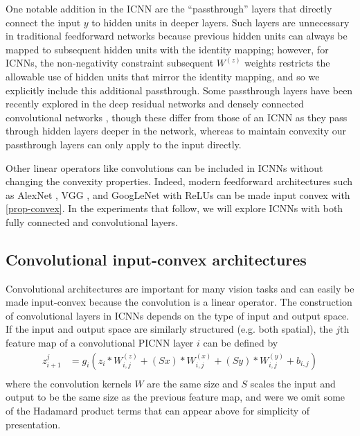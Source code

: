 One notable addition in the ICNN are the ``passthrough'' layers that directly
connect the input $y$ to hidden units in deeper layers.  Such layers are
unnecessary in traditional feedforward networks because previous hidden units
can always be mapped to subsequent hidden units with the identity mapping;
however, for ICNNs, the non-negativity constraint subsequent $W^{(z)}$ weights
restricts the allowable use of hidden units that mirror the identity mapping,
and so we explicitly include this additional passthrough.  Some
passthrough layers have been recently explored in the deep residual networks
\citep{he2015deep} and densely connected convolutional
networks \citep{huang2016densely},
though these differ from those of an ICNN as they pass through
hidden layers deeper in the network, whereas to maintain convexity our
passthrough layers can only apply to the input directly.

Other linear operators like convolutions can
be included in ICNNs without changing the convexity properties.
Indeed, modern feedforward architectures such as AlexNet
\citep{krizhevsky2012imagenet}, VGG \citep{simonyan2014very}, and GoogLeNet
\citep{szegedy2015going} with ReLUs \citep{nair2010rectified} can be made
input convex with \cref{prop-convex}.
In the experiments that follow, we will explore ICNNs with both
fully connected and convolutional layers.

\subsection{Convolutional input-convex architectures}
Convolutional architectures are important for many vision
tasks and can easily be made input-convex because
the convolution is a linear operator.
The construction of convolutional layers in ICNNs depends
on the type of input and output space.
If the input and output space are similarly
structured (e.g. both spatial), the $j$th feature map
of a convolutional PICNN layer $i$ can be defined by
\begin{equation}
\begin{split}
z_{i+1}^j & = g_i\left(z_i\ast W_{i,j}^{(z)} + (Sx)\ast W_{i,j}^{(x)} + (Sy)\ast
W_{i,j}^{(y)} + b_{i,j} \right) \\
\end{split}
\end{equation}
where the convolution kernels $W$ are the same size and
$S$ scales the input and output to be the same size as
the previous feature map, and were we omit some of the Hadamard product terms
that can appear above for simplicity of presentation.


